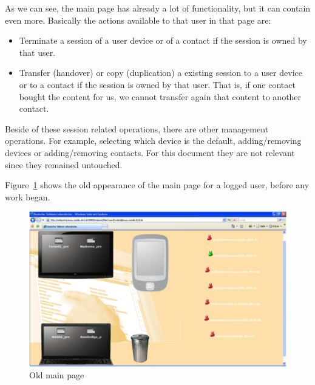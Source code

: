 As we can see, the main  page has already a lot of functionality, but it can contain even more. Basically the actions available to that user in that page are:

\begin{itemize}
  \item Terminate a session of a user device or of a contact if the session is owned by that user.
  \item Transfer (handover) or copy (duplication) a existing session to a user device or to a contact if the session is owned by that user. That is, if one contact bought the content for us, we cannot transfer again that content to another contact.
\end{itemize}

Beside of these session related operations, there are other management operations.
For example, selecting which device is the default, adding/removing devices or adding/removing contacts.
For this document they are not relevant since they remained untouched.

Figure~\ref{fig:pnai-old} shows the old appearance of the main page for a logged user, before any work began.

\begin{figure}[htbp]
  \centering
    \includegraphics[width=\textwidth]{figures/pnai-old.png}
  \caption{Old main  page}
  \label{fig:pnai-old}
\end{figure}


